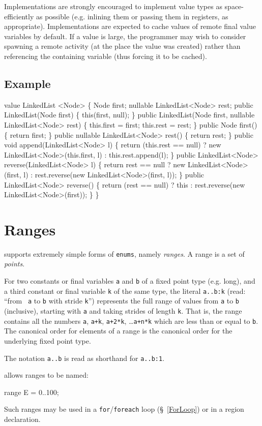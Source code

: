 Implementations are strongly encouraged to implement value types as
space-efficiently as possible (e.g.{} inlining them or passing them in
registers, as appropriate).  Implementations are expected to cache
values of remote final value variables by default. If a value is
large, the programmer may wish to consider spawning a remote activity
(at the place the value was created) rather than referencing the
containing variable (thus forcing it to be cached).


\subsection{Example}
\begin{x10}
 value LinkedList <Node> \{ 
  Node first;
  nullable LinkedList<Node> rest;
  public
     LinkedList(Node first) \{
     this(first, null);
  \}
  public
    LinkedList(Node first,  nullable LinkedList<Node> rest) \{
    this.first = first;
    this.rest = rest;
  \}
  public 
    Node first() \{
    return first;
  \}
  public 
    nullable LinkedList<Node> rest() \{
    return rest;
  \} 
  public
    void append(LinkedList<Node> l) \{
    return (this.rest == null) 
        ? new LinkedList<Node>(this.first, l) 
        : this.rest.append(l);
  \}
  public 
    LinkedList<Node> reverse(LinkedList<Node> l) \{ 
    return 
      rest == null 
      ? new LinkedList<Node>(first, l)  
      : rest.reverse(new LinkedList<Node>(first, l));
   \}
  public
    LinkedList<Node> reverse() \{
    return (rest == null) 
        ? this 
        : rest.reverse(new LinkedList<Node>(first));
  \}
\}
\end{x10}

\section{Ranges}\label{XtenRanges}

\XtenCurrVer{} supports extremely simple forms of {\tt enums}, namely {\em ranges}. A range is a set of {\em points}.

For two constants or final variables {\tt a} and {\tt b} of a fixed
point type (e.g.{} {\cf long}), and a third constant or final variable
{\tt k} of the same type, the literal {\tt a..b:k} (read: ``from {\tt
a} to {\tt b} with stride {\tt k}'') represents the full range of
values from {\tt a} to {\tt b} (inclusive), starting with {\tt a} and
taking strides of length {\tt k}. That is, the range contains all the
numbers {\tt a}, {\tt a+k}, {\tt a+2*k}, \ldots {\tt a+n*k} which are
less than or equal to {\tt b}. The canonical order for elements of a
range is the canonical order for the underlying fixed point type.

The notation {\tt a..b} is read as shorthand for {\tt a..b:1}.

\Xten{} allows ranges to be named:
\begin{x10}
   range   E = 0..100;
\end{x10}

Such ranges may be used in a {\tt for}/{\tt foreach} loop
(\S~\ref{ForLoop}) or in a region declaration.






